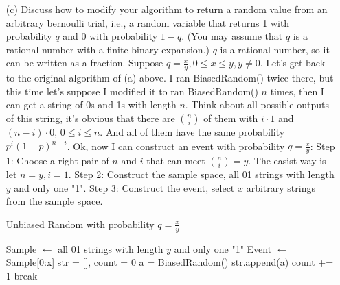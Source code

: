 \documentclass{article}       %
\begin{document}
\begin{enumerate}
\begin{enumerate}
        	\item[(c)] Discuss how to modify your algorithm to return a random value from an arbitrary bernoulli trial, i.e., a random variable that returns 1 with probability $q$ and 0 with probability $1-q$. (You may assume that $q$ is a rational number with a finite binary expansion.)\newline\newline
        	$q$ is a rational number, so it can be written as a fraction. Suppose $q = \frac{x}{y}, 0 \leq x \leq y, y \neq 0$.\newline
        	Let's get back to the original algorithm of (a) above. I ran BiasedRandom() twice there, but this time let's suppose I modified it to ran BiasedRandom() $n$ times, then I can get a string of 0s and 1s with length $n$. Think about all possible outputs of this string, it's obvious that there are $n \choose i$ of them with $i \cdot 1$ and $(n-i) \cdot 0$, $0 \leq i \leq n$. And all of them have the same probability $p^i(1-p)^{n-i}$.\newline
        	Ok, now I can construct an event with probability $q = \frac{x}{y}$:\newline
        	Step 1: Choose a right pair of $n$ and $i$ that can meet ${n \choose i} = y$. The easist way is let $n = y, i = 1$.\newline
        	Step 2: Construct the sample space, all 01 strings with length $y$ and only one "1".\newline
        	Step 3: Construct the event, select $x$  arbitrary strings from the sample space.\newline
          \begin{algorithm}[H]
        		\caption{Unbiased Random with probability $q = \frac{x}{y}$}
        		\small
        		\begin{algorithmic}[1]
        			\State Sample $\gets$ all 01 strings with length $y$ and only one "1"
        			\State Event $\gets$ Sample[0:x]
        			\State str = [], count = 0
        			\State a = BiasedRandom()
        			\State str.append(a)
        			\State count += 1
        			\EndIf
        			\State break
        			\EndIf 
        			\EndFor
        			\State {}
        			\Else {}
        			\State {}
        			\EndIf
        			\EndIf
        			\EndWhile

\end{algorithmic}
\end{algorithm}
\end{enumerate}
\end{enumerate}
\end{document}
